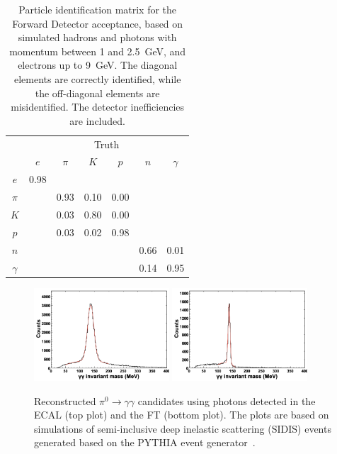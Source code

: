 \begin{table}[htpb]
  \begin{center}
    \begin{tabular}{|c|cccccc|}\hline
          & \multicolumn{6}{c|}{Truth}\\        
          & $e$  & $\pi$ & $K$  & $p$  & $n$  & $\gamma$ \\\hline
  $e$     & 0.98 &       &      &      &      &          \\ 
  $\pi$   &      &  0.93 & 0.10 & 0.00 &      &          \\ 
  $K$     &      &  0.03 & 0.80 & 0.00 &      &          \\ 
  $p$     &      &  0.03 & 0.02 & 0.98 &      &          \\ 
  $n$     &      &       &      &      & 0.66 &   0.01   \\ 
 $\gamma$ &      &       &      &      & 0.14 &   0.95   \\\hline 
    \end{tabular}  
    \caption{Particle identification matrix for the Forward Detector acceptance, based on simulated hadrons and
      photons with momentum between 1 and 2.5~GeV, and electrons up to 9~GeV. The diagonal elements are
      correctly identified, while the off-diagonal elements are misidentified. The detector inefficiencies are included.}
  \label{table:pidmatrix}
  \end{center}
\end{table}

\begin{figure}[t]
\centering
\includegraphics[width=0.45\textwidth]{pics/ecal_pi0.png}
\includegraphics[width=0.45\textwidth]{pics/ft_pi0.png}
\caption{Reconstructed $\pi^0 \to \gamma \gamma$ candidates using photons detected in the ECAL (top plot) and
  the FT (bottom plot). The plots are based on simulations of semi-inclusive deep inelastic scattering (SIDIS) events
  generated based on the PYTHIA event generator~\cite{clasdis}.}
\label{fig:pi0mass}
\end{figure}

